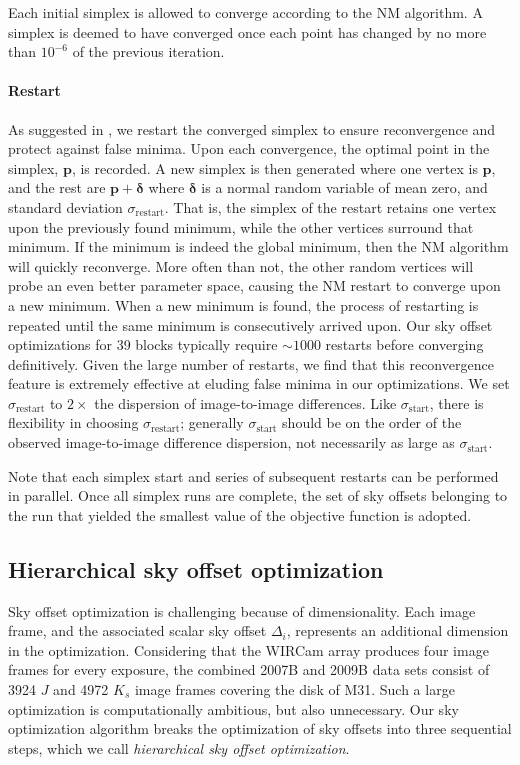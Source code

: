 \documentclass[iop]{emulateapj}
\newcommand{\vect}[1]{\boldsymbol{#1}} %
\begin{document}
Each initial simplex is allowed to converge according to the NM algorithm.
A simplex is deemed to have converged once each point has changed by no more than $10^{-6}$ of the previous iteration.

\paragraph{Restart} As suggested in \cite{Press:2007}, we restart the converged simplex to ensure reconvergence and protect against false minima.
Upon each convergence, the optimal point in the simplex, $\vect{p}$, is recorded.
A new simplex is then generated where one vertex is $\vect{p}$, and the rest are $\vect{p}+\vect{\delta}$ where $\vect{\delta}$ is a normal random variable of mean zero, and standard deviation $\sigma_\mathrm{restart}$.
That is, the simplex of the restart retains one vertex upon the previously found minimum, while the other vertices surround that minimum.
If the minimum is indeed the global minimum, then the NM algorithm will quickly reconverge.
More often than not, the other random vertices will probe an even better parameter space, causing the NM restart to converge upon a new minimum.
When a new minimum is found, the process of restarting is repeated until the same minimum is consecutively arrived upon.
Our sky offset optimizations for 39 blocks typically require $\sim1000$ restarts before converging definitively.
Given the large number of restarts, we find that this reconvergence feature is extremely effective at eluding false minima in our optimizations.
We set $\sigma_\mathrm{restart}$ to $2\times$ the dispersion of image-to-image differences.
Like $\sigma_\mathrm{start}$, there is flexibility in choosing $\sigma_\mathrm{restart}$; generally $\sigma_\mathrm{start}$ should be on the order of the observed image-to-image difference dispersion, not necessarily as large as $\sigma_\mathrm{start}$.

Note that each simplex start and series of subsequent restarts can be performed in parallel.
Once all simplex runs are complete, the set of sky offsets belonging to the run that yielded the smallest value of the objective function is adopted.

\subsection{Hierarchical sky offset optimization}
\label{sec:hierarchical_algo}

Sky offset optimization is challenging because of dimensionality.
Each image frame, and the associated scalar sky offset $\Delta_i$, represents an additional dimension in the optimization.
Considering that the WIRCam array produces four image frames for every exposure, the combined 2007B and 2009B data sets consist of 3924 $J$ and 4972 $K_s$ image frames covering the disk of M31.
Such a large optimization is computationally ambitious, but also unnecessary.
Our sky optimization algorithm breaks the optimization of sky offsets into three sequential steps, which we call \emph{hierarchical sky offset optimization}.
\end{document}
